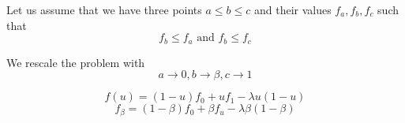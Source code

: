 \documentclass[aps,12pt]{revtex4}
\begin{document}
Let us assume that we have three points $a\leq b \leq c$ and their values
$f_a,f_b,f_c$ such that
\begin{equation}
	f_b \leq f_a \text{ and } f_b \leq f_c
\end{equation} 

We rescale the problem with
$$
	a \to 0, b \to \beta, c \to 1
$$	

$$
	f(u) = (1-u) f_0 + u f_1 - \lambda u(1-u)
$$
$$
	f_\beta = (1-\beta) f_0 + \beta f_u - \lambda \beta(1-\beta)
$$
\end{document}
